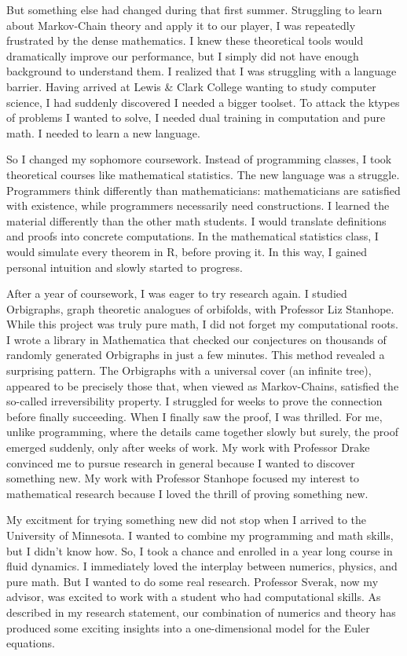 \documentclass[12pt]{article}
\begin{document}
But something else had changed during that first summer. Struggling to learn about Markov-Chain theory and apply it to our player, I was repeatedly frustrated by the dense mathematics. I knew these theoretical tools would dramatically improve our performance, but I simply did not have enough background to understand them. I realized that I was struggling with a language barrier. Having arrived at Lewis \& Clark College wanting to study computer science, I had suddenly discovered I needed a bigger toolset. To attack the ktypes of problems I wanted to solve, I needed dual training in computation and pure math. I needed to learn a new language.

So I changed my sophomore coursework. Instead of programming classes, I took  theoretical courses like mathematical statistics. The new language was a struggle. Programmers think differently than mathematicians: mathematicians are satisfied with existence, while programmers necessarily need constructions. I learned the material differently than the other math students. I would translate definitions and proofs into concrete computations. In the mathematical statistics class, I would simulate every theorem in R, before proving it. In this way, I gained personal intuition and slowly started to progress.

After a year of coursework, I was eager to try research again. I studied Orbigraphs, graph theoretic analogues of orbifolds, with Professor Liz Stanhope. While this project was truly pure math, I did not forget my computational roots. I wrote a library in Mathematica that checked our conjectures on thousands of randomly generated Orbigraphs in just a few minutes. This method revealed a surprising pattern. The Orbigraphs with a universal cover (an infinite tree), appeared to be precisely those that, when viewed as Markov-Chains, satisfied the so-called irreversibility property. I struggled for weeks to prove the connection before finally succeeding. When I finally saw the proof, I was thrilled. For me, unlike programming, where the details came together slowly but surely, the proof emerged suddenly, only after weeks of work. My work with Professor Drake convinced me to pursue research in general because I wanted to discover something new. My work with Professor Stanhope focused my interest to mathematical research because I loved the thrill of proving something new.

My excitment for trying something new did not stop when I arrived to the University of Minnesota. I wanted to combine my programming and math skills, but I didn't know how. So, I took a chance and enrolled in a year long course in fluid dynamics. I immediately loved the interplay between numerics, physics, and pure math. But I wanted to do some real research. Professor Sverak, now my advisor, was excited to work with a student who had computational skills. As described in my research statement, our combination of numerics and theory has produced some exciting insights into a one-dimensional model for the Euler equations.
\end{document}
